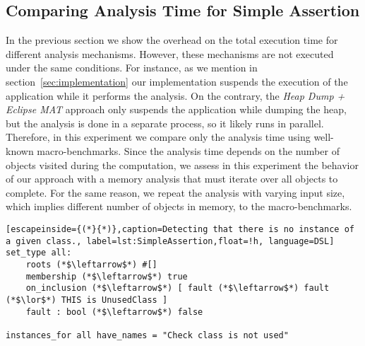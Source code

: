 \subsection{Comparing Analysis Time for Simple Assertion}

In the previous section we show the overhead on the total execution time for different analysis mechanisms.
However, these mechanisms are not executed under the same conditions.
For instance, as we mention in section~\ref{sec:implementation} our implementation suspends the execution of the application while it performs the analysis.
On the contrary, the \textit{Heap Dump + Eclipse MAT} approach only suspends the application while dumping the heap, but the analysis is done in a separate process, so it likely runs in parallel.
Therefore, in this experiment we compare only the analysis time using well-known macro-benchmarks.
Since the analysis time depends on the number of objects visited during the computation, we assess in this experiment the behavior of our approach with a memory analysis that must iterate over all objects to complete.
For the same reason, we repeat the analysis with varying input size, which implies different number of objects in memory, to the macro-benchmarks.

\begin{lstlisting}[escapeinside={(*}{*)},caption=Detecting that there is no instance of a given class., label=lst:SimpleAssertion,float=!h, language=DSL]
set_type all: 
	roots (*$\leftarrow$*) #[]
	membership (*$\leftarrow$*) true
	on_inclusion (*$\leftarrow$*) [ fault (*$\leftarrow$*) fault (*$\lor$*) THIS is UnusedClass ]
	fault : bool (*$\leftarrow$*) false
 
instances_for all have_names = "Check class is not used"
\end{lstlisting}

